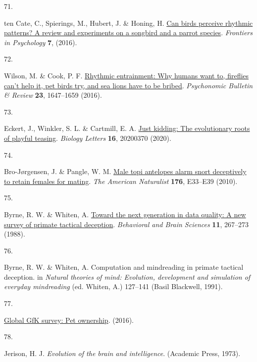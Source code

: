 \documentclass[
  man,floatsintext]{apa6}
\newlength{\cslhangindent}
\newlength{\csllabelwidth}
\newlength{\cslentryspacingunit} %
\newenvironment{CSLReferences}[2] %
 {%
  \setlength{\parindent}{0pt}
  \ifodd #1
  \let\oldpar\par
  \def\par{\hangindent=\cslhangindent\oldpar}
  \fi
  \setlength{\parskip}{#2\cslentryspacingunit}
 }%
 {}
\newcommand{\CSLLeftMargin}[1]{\parbox[t]{\csllabelwidth}{#1}}
\newcommand{\CSLRightInline}[1]{\parbox[t]{\linewidth - \csllabelwidth}{#1}\break}
\begin{document}
\begin{CSLReferences}{0}{0}
\leavevmode{}%
\CSLLeftMargin{71. }%
\CSLRightInline{ten Cate, C., Spierings, M., Hubert, J. \& Honing, H. \href{https://doi.org/10.3389/fpsyg.2016.00730}{Can birds perceive rhythmic patterns? A review and experiments on a songbird and a parrot species}. \emph{Frontiers in Psychology} \textbf{7}, (2016).}

\leavevmode{}%
\CSLLeftMargin{72. }%
\CSLRightInline{Wilson, M. \& Cook, P. F. \href{https://doi.org/10.3758/s13423-016-1013-x}{Rhythmic entrainment: Why humans want to, fireflies can't help it, pet birds try, and sea lions have to be bribed}. \emph{Psychonomic Bulletin \& Review} \textbf{23}, 1647--1659 (2016).}

\leavevmode{}%
\CSLLeftMargin{73. }%
\CSLRightInline{Eckert, J., Winkler, S. L. \& Cartmill, E. A. \href{https://doi.org/10.1098/rsbl.2020.0370}{Just kidding: The evolutionary roots of playful teasing}. \emph{Biology Letters} \textbf{16}, 20200370 (2020).}

\leavevmode{}%
\CSLLeftMargin{74. }%
\CSLRightInline{Bro-Jørgensen, J. \& Pangle, W. M. \href{https://doi.org/10.1086/653078}{Male topi antelopes alarm snort deceptively to retain females for mating}. \emph{The American Naturalist} \textbf{176}, E33--E39 (2010).}

\leavevmode{}%
\CSLLeftMargin{75. }%
\CSLRightInline{Byrne, R. W. \& Whiten, A. \href{https://doi.org/10.1017/S0140525X00049955}{Toward the next generation in data quality: A new survey of primate tactical deception}. \emph{Behavioral and Brain Sciences} \textbf{11}, 267--273 (1988).}

\leavevmode{}%
\CSLLeftMargin{76. }%
\CSLRightInline{Byrne, R. W. \& Whiten, A. Computation and mindreading in primate tactical deception. in \emph{Natural theories of mind: Evolution, development and simulation of everyday mindreading} (ed. Whiten, A.) 127--141 (Basil Blackwell, 1991).}

\leavevmode{}%
\CSLLeftMargin{77. }%
\CSLRightInline{\href{http://www.gfk.com/global-studies/global-studies-pet-ownership}{Global GfK survey: Pet ownership}. (2016).}

\leavevmode{}%
\CSLLeftMargin{78. }%
\CSLRightInline{Jerison, H. J. \emph{Evolution of the brain and intelligence}. (Academic Press, 1973).}


\end{CSLReferences}
\end{document}
